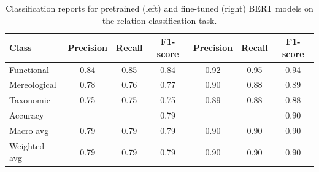 \documentclass[stu,floatsintext]{apa7}
\begin{document}
\medskip
\begin{table}[ht]
  \centering
  \caption{Classification reports for pretrained (left) and fine-tuned (right) BERT models on the relation classification task.}
  \label{tab:classification}
  \begin{tabular}{|l||ccc||ccc|}
    \hline
    \textbf{Class} & \textbf{Precision} & \textbf{Recall} & \textbf{F1-score} & \textbf{Precision} & \textbf{Recall} & \textbf{F1-score} \\
    \hline
    Functional     & 0.84 & 0.85 & 0.84 & 0.92 & 0.95 & 0.94 \\
    Mereological   & 0.78 & 0.76 & 0.77 & 0.90 & 0.88 & 0.89 \\
    Taxonomic      & 0.75 & 0.75 & 0.75 & 0.89 & 0.88 & 0.88 \\
    \hline
    Accuracy       & \multicolumn{2}{c}{} & 0.79 & \multicolumn{2}{c}{} & 0.90 \\
    Macro avg      & 0.79 & 0.79 & 0.79 & 0.90 & 0.90 & 0.90 \\
    Weighted avg   & 0.79 & 0.79 & 0.79 & 0.90 & 0.90 & 0.90 \\
    \hline
  \end{tabular}
\end{table}
\end{document}
